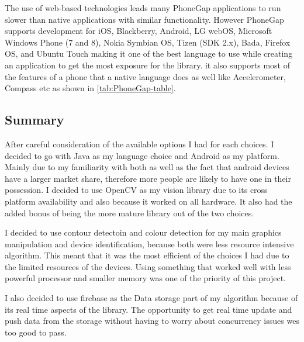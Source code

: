 The use of web-based technologies leads many PhoneGap applications
to run slower than native applications with similar functionality.
However PhoneGap supports development for iOS, Blackberry, Android,
LG webOS, Microsoft Windows Phone (7 and 8), Nokia Symbian OS, Tizen
(SDK 2.x), Bada, Firefox OS, and Ubuntu Touch making it one of the
best language to use while creating an application to get the most
exposure for the library. it also supports most of the features of
a phone that a native language does as well like Accelerometer, Compass
etc as shown in \ref{tab:PhoneGap-table}.

\subsection{Summary}
After careful consideration of the available options I had for each choices. I decided to go with Java as my language choice and Android as my platform. Mainly due to my familiarity with both as well as the fact that android devices have a larger market share, therefore more people are likely to have one in their possession.  I decided to use OpenCV as my vision library due to its cross platform availability and also because it worked on all hardware. It also had the added bonus of being the more mature library out of the two choices.

I decided to use contour detectoin and colour detection for my main graphics manipulation and device identification, because both were less resource intensive algorithm. This meant that it was the most efficient of the choices I had due to the limited resources of the devices. Using something that worked well with less powerful processor and smaller memory was one of the priority of this project.

I also decided to use firebase as the Data storage part of my algorithm because of its real time aspects of the library. The opportunity to get real time update and push data from the storage without having to worry about concurrency issues wes too good to pass.


